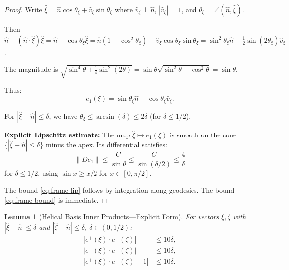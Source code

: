 \documentclass[11pt]{article}
\newtheorem{lemma}[theorem]{Lemma}
\theoremstyle{definition}
\begin{document}
\begin{proof}
Write $\hat{\xi} = \hat{n}\cos\theta_\xi + \hat{v}_\xi \sin\theta_\xi$ where $\hat{v}_\xi \perp \hat{n}$, $|\hat{v}_\xi| = 1$, and $\theta_\xi = \angle(\hat{n}, \hat{\xi})$.

Then $\hat{n} - (\hat{n} \cdot \hat{\xi})\hat{\xi} = \hat{n} - \cos\theta_\xi \hat{\xi} = \hat{n}(1 - \cos^2\theta_\xi) - \hat{v}_\xi \cos\theta_\xi \sin\theta_\xi = \sin^2\theta_\xi \hat{n} - \frac{1}{2}\sin(2\theta_\xi)\hat{v}_\xi$.

The magnitude is $\sqrt{\sin^4\theta + \frac{1}{4}\sin^2(2\theta)} = \sin\theta\sqrt{\sin^2\theta + \cos^2\theta} = \sin\theta$.

Thus:
\begin{equation}
e_1(\xi) = \sin\theta_\xi \hat{n} - \cos\theta_\xi \hat{v}_\xi.
\end{equation}

For $|\hat{\xi} - \hat{n}| \leq \delta$, we have $\theta_\xi \leq \arcsin(\delta) \leq 2\delta$ (for $\delta \leq 1/2$).

\textbf{Explicit Lipschitz estimate:} The map $\hat{\xi} \mapsto e_1(\xi)$ is smooth on the cone $\{|\hat{\xi} - \hat{n}| \leq \delta\}$ minus the apex. Its differential satisfies:
\begin{equation}
\|De_1\| \leq \frac{C}{\sin\theta} \leq \frac{C}{\sin(\delta/2)} \leq \frac{4}{\delta}
\end{equation}
for $\delta \leq 1/2$, using $\sin x \geq x/2$ for $x \in [0, \pi/2]$.

The bound \eqref{eq:frame-lip} follows by integration along geodesics. The bound \eqref{eq:frame-bound} is immediate.
\end{proof}

\begin{lemma}[Helical Basis Inner Products---Explicit Form]\label{lem:helical-inner}
For vectors $\xi, \zeta$ with $|\hat{\xi} - \hat{n}| \leq \delta$ and $|\hat{\zeta} - \hat{n}| \leq \delta$, $\delta \in (0, 1/2)$:
\begin{align}
|e^+(\xi) \cdot e^+(\zeta)| &\leq 10\delta, \label{eq:pp}\\
|e^-(\xi) \cdot e^-(\zeta)| &\leq 10\delta, \label{eq:mm}\\
|e^+(\xi) \cdot e^-(\zeta) - 1| &\leq 10\delta. \label{eq:pm}
\end{align}
\end{lemma}
\end{document}
